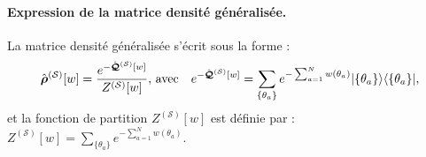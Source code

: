 	

\paragraph{Expression de la matrice densité généralisée.}
La matrice densité généralisée s’écrit sous la forme :
\begin{eqnarray}\label{chap.2.densite.1}
	\hat{\bm{\rho}}^{(\mathcal{S})}[w]  =  \frac{e^{-\hat{\bm{\mathcal{Q}}}^{(\mathcal{S})}[w]}}{Z^{(\mathcal{S})}[w]}, \, \mbox{avec} \quad e^{-\hat{\bm{\mathcal{Q}}}^{(\mathcal{S})}[w]}  = 	\sum_{\{\theta_a \}} e^{- \sum_{a = 1}^N w(\theta_a) } \vert \{ \theta_a\} \rangle \langle  \{ \theta_a\}  \vert, 
\end{eqnarray}	
et la fonction de partition $Z^{(\mathcal{S})}[w]$ est définie par :
\(
	Z^{(\mathcal{S})}[w]   =  \sum_{\{\theta_a \}} e^{-\sum_{a = 1}^N w(\theta_a)}.		
\)

